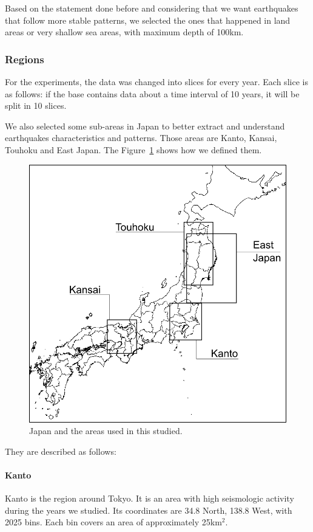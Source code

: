 Based on the statement done before and considering that we want earthquakes that follow more stable patterns, we selected the ones that happened in land areas or very shallow sea areas, with maximum depth of 100km.

\subsubsection{Regions}
For the experiments, the data was changed into slices for every year. Each slice is as follows: if the base contains data about a time interval of 10 years, it will be split in 10 slices.

We also selected some sub-areas in Japan to better extract and understand earthquakes characteristics and patterns. Those areas are Kanto, Kansai, Touhoku and East Japan. The Figure~\ref{alljapan} shows how we defined them. 

\begin{figure}[H]
	\centering
	\includegraphics[scale=0.25]{img/alljapan.png}
	\caption{Japan and the areas used in this studied.}
	\label{alljapan}
\end{figure}


They are described as follows:

\paragraph{Kanto} Kanto is the region around Tokyo. It is an area with high seismologic activity during the years we studied. Its coordinates are 34.8 North, 138.8 West, with  2025 bins. Each bin covers an area of approximately 25km$^2$.

